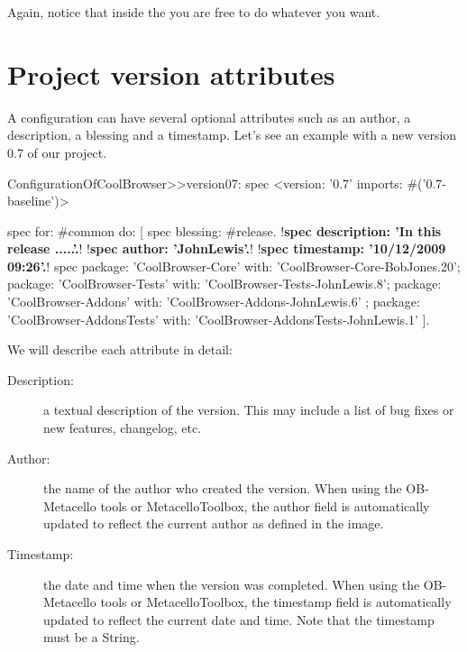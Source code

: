 \documentclass[a4paper,10pt,twoside]{book}
\begin{document}
Again, notice that inside the  you are free to do whatever you want.

\section{Project version attributes}
 
 
A configuration can have several optional attributes such as    
an author, a description, a blessing and a timestamp.  Let's see an example with a new version 0.7 of our project.
 
\begin{code}{}
ConfigurationOfCoolBrowser>>version07: spec 
       <version: '0.7' imports: #('0.7-baseline')>
       
       spec for: #common do: [
              spec blessing: #release.
              !\textbf{spec description: 'In this release .....'.}!
              !\textbf{spec author: 'JohnLewis'.}!
              !\textbf{spec timestamp: '10/12/2009 09:26'.}!
              spec 
                     package: 'CoolBrowser-Core' with: 'CoolBrowser-Core-BobJones.20';
                     package: 'CoolBrowser-Tests' with: 'CoolBrowser-Tests-JohnLewis.8';
                     package: 'CoolBrowser-Addons' with: 'CoolBrowser-Addons-JohnLewis.6' ;
                     package: 'CoolBrowser-AddonsTests' with: 'CoolBrowser-AddonsTests-JohnLewis.1' ].
\end{code}
 
We will describe each attribute in detail:
 
\begin{description}

\item[ Description:] a textual description of the version. This may include a list of bug fixes or new features, changelog, etc.
\item[  Author:] the name of the author who created the version. When using the OB-Metacello tools or MetacelloToolbox, the author field is automatically updated to reflect the current author as defined in the image.
\item[  Timestamp:] the date and time when the version was completed. When using the OB-Metacello tools or MetacelloToolbox, the timestamp field is automatically updated to reflect the current date and time. Note that the timestamp must be a String.

\end{description}
\end{document}
